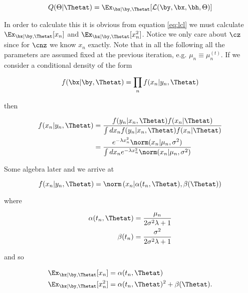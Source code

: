 \begin{equation}
Q(\Theta|\Thetat) = \Ex_{\bx | \by, \Thetat} [\mathcal{L}(\by, \bx, \bh, \Theta)]
\end{equation}

In order to calculate this it is obvious from equation \ref{eq:lcl} we must calculate $\Ex_{\bx | \by, \Thetat} [ x_n ]$ and $\Ex_{\bx | \by, \Thetat} [ x_n^2 ]$. Notice we only care about $\cz$ since for $\cnz$ we know $x_n$ exactly. Note that in all the following all the parameters are assumed fixed at the previous iteration, e.g. $\mu_n \equiv \mu_n^{(t)}$. If we consider a conditional density of the form

\begin{equation}
f(\bx | \by, \Thetat) = \prod_n f(x_n | y_n, \Thetat)
\end{equation}

then

\begin{equation}
\begin{aligned}
f(x_n | y_n, \Thetat) & = \frac{f(y_n | x_n, \Thetat)f(x_n | \Thetat)}{\int dx_n f(y_n | x_n, \Thetat)f(x_n | \Thetat)} \\
& = \frac{e^{-\lambda x_n^2} \norm(x_n | \mu_n, \sigma^2)}{\int dx_n e^{-\lambda x_n^2} \norm(x_n | \mu_n, \sigma^2)}
\end{aligned}
\end{equation}


Some algebra later and we arrive at

\begin{equation}
f(x_n | y_n, \Thetat) = \norm\left(x_n | \alpha(t_n, \Thetat), \beta(\Thetat) \right)
\end{equation}

where

\begin{equation}
\begin{aligned}
\alpha(t_n, \Thetat) & = \frac{\mu_n}{2 \sigma^2 \lambda + 1} \\
\beta(t_n) & = \frac{\sigma^2}{2 \sigma^2 \lambda + 1}
\end{aligned}
\end{equation}

and so

\begin{equation}
\begin{aligned}
\Ex_{\bx | \by, \Thetat} [ x_n ] &= \alpha(t_n, \Thetat)  \\
\Ex_{\bx | \by, \Thetat} [ x_n^2  ] &= \alpha(t_n, \Thetat)^2 + \beta(\Thetat).
\end{aligned}
\end{equation}

